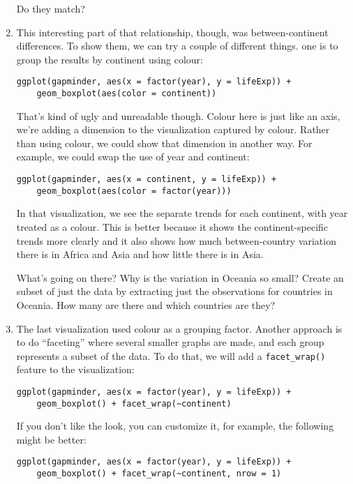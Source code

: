 \documentclass[a4paper,12pt]{article}
\begin{document}
\begin{enumerate}
Do they match?

\item This interesting part of that relationship, though, was between-continent differences. To show them, we can try a couple of different things. one is to group the results by continent using colour:

\begin{verbatim}
ggplot(gapminder, aes(x = factor(year), y = lifeExp)) +     
    geom_boxplot(aes(color = continent))
\end{verbatim}

That's kind of ugly and unreadable though. Colour here is just like an axis, we're adding a dimension to the visualization captured by colour. Rather than using colour, we could show that dimension in another way. For example, we could swap the use of year and continent:

\begin{verbatim}
ggplot(gapminder, aes(x = continent, y = lifeExp)) +     
    geom_boxplot(aes(color = factor(year)))
\end{verbatim}

In that visualization, we see the separate trends for each continent, with year treated as a colour. This is better because it shows the continent-specific trends more clearly and it also shows how much between-country variation there is in Africa and Asia and how little there is in Asia.

What's going on there? Why is the variation in Oceania so small? Create an subset of just the data by extracting just the observations for countries in Oceania. How many are there and which countries are they?

\item The last visualization used colour as a grouping factor. Another approach is to do ``faceting'' where several smaller graphs are made, and each group represents a subset of the data. To do that, we will add a \texttt{facet\_wrap()} feature to the visualization:

\begin{verbatim}
ggplot(gapminder, aes(x = factor(year), y = lifeExp)) +     
    geom_boxplot() + facet_wrap(~continent)
\end{verbatim}

If you don't like the look, you can customize it, for example, the following might be better:

\begin{verbatim}
ggplot(gapminder, aes(x = factor(year), y = lifeExp)) +     
    geom_boxplot() + facet_wrap(~continent, nrow = 1)
\end{verbatim}


\end{enumerate}
\end{document}
